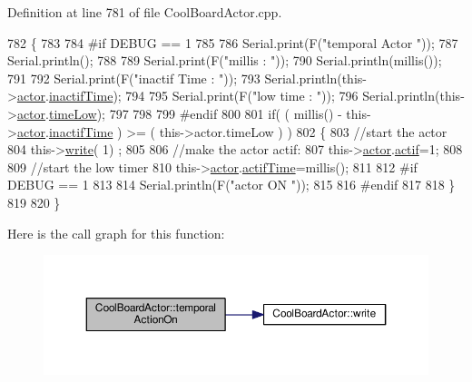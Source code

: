 Definition at line 781 of file Cool\+Board\+Actor.\+cpp.


\begin{DoxyCode}
782 \{
783 
784 \textcolor{preprocessor}{#if DEBUG == 1}
785     
786     Serial.print(F(\textcolor{stringliteral}{"temporal Actor "}));
787     Serial.println();
788 
789     Serial.print(F(\textcolor{stringliteral}{"millis : "}));
790     Serial.println(millis());
791 
792     Serial.print(F(\textcolor{stringliteral}{"inactif Time : "}));
793     Serial.println(this->\hyperlink{class_cool_board_actor_a8f190db9f7a39fddbcef7f152da970e9}{actor}.\hyperlink{struct_cool_board_actor_1_1state_a6d88835f4402b3b81cd404784281854b}{inactifTime});
794 
795     Serial.print(F(\textcolor{stringliteral}{"low time : "}));
796     Serial.println(this->\hyperlink{class_cool_board_actor_a8f190db9f7a39fddbcef7f152da970e9}{actor}.\hyperlink{struct_cool_board_actor_1_1state_a314c53c146e8c7b12c025323a34fbb9a}{timeLow});
797 
798 
799 \textcolor{preprocessor}{#endif}
800     
801      \textcolor{keywordflow}{if}( ( millis() - this->\hyperlink{class_cool_board_actor_a8f190db9f7a39fddbcef7f152da970e9}{actor}.\hyperlink{struct_cool_board_actor_1_1state_a6d88835f4402b3b81cd404784281854b}{inactifTime} ) >= (  this->actor.timeLow  ) )
802     \{
803         \textcolor{comment}{//start the actor}
804         this->\hyperlink{class_cool_board_actor_a958786ff01ea1056ee72c72d439f86da}{write}( 1) ;
805 
806         \textcolor{comment}{//make the actor actif:}
807         this->\hyperlink{class_cool_board_actor_a8f190db9f7a39fddbcef7f152da970e9}{actor}.\hyperlink{struct_cool_board_actor_1_1state_a7963178c2de01ef0d2861f9f59ad6f3c}{actif}=1;
808 
809         \textcolor{comment}{//start the low timer}
810         this->\hyperlink{class_cool_board_actor_a8f190db9f7a39fddbcef7f152da970e9}{actor}.\hyperlink{struct_cool_board_actor_1_1state_a534119a22a09b29ecb446b277d5b2ef5}{actifTime}=millis();
811 
812 \textcolor{preprocessor}{    #if DEBUG == 1 }
813 
814         Serial.println(F(\textcolor{stringliteral}{"actor ON "}));
815 
816 \textcolor{preprocessor}{    #endif              }
817 
818     \}
819 
820 \}
\end{DoxyCode}
Here is the call graph for this function\+:\nopagebreak
\begin{figure}[H]
\begin{center}
\leavevmode
\includegraphics[width=350pt]{dc/d69/class_cool_board_actor_ada603785c203fdb0b41cc967d70bdc4d_cgraph}
\end{center}
\end{figure}
